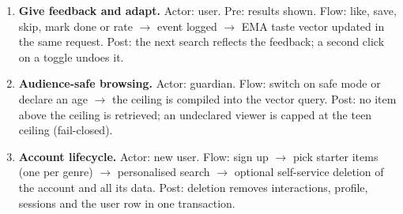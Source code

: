 \documentclass[11pt, a4paper]{article}
\begin{document}
\begin{itemize}[noitemsep, topsep=2pt]
\begin{enumerate}[noitemsep, topsep=2pt]
        \item \textbf{Give feedback and adapt.} Actor: user. Pre: results shown. Flow: like, save, skip, mark done or rate $\rightarrow$ event logged $\rightarrow$ EMA taste vector updated in the same request. Post: the next search reflects the feedback; a second click on a toggle undoes it.
        \item \textbf{Audience-safe browsing.} Actor: guardian. Flow: switch on safe mode or declare an age $\rightarrow$ the ceiling is compiled into the vector query. Post: no item above the ceiling is retrieved; an undeclared viewer is capped at the teen ceiling (fail-closed).
        \item \textbf{Account lifecycle.} Actor: new user. Flow: sign up $\rightarrow$ pick starter items (one per genre) $\rightarrow$ personalised search $\rightarrow$ optional self-service deletion of the account and all its data. Post: deletion removes interactions, profile, sessions and the user row in one transaction.
    \end{enumerate}
\end{itemize}
\end{document}
